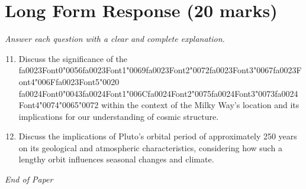 \documentclass[12pt]{article}
\begin{document}
\section*{Long Form Response (20 marks)}
\textit{Answer each question with a clear and complete explanation.}
\begin{enumerate}[label=\arabic*.]
\setcounter{enumi}{10}
\item Discuss the significance of the {\csname fa0023Font0\endcsname\char"0056}{\csname fa0023Font1\endcsname\char"0069}{\csname fa0023Font2\endcsname\char"0072}{\csname fa0023Font3\endcsname\char"0067}{\csname fa0023Font4\endcsname\char"006F}{\csname fa0023Font5\endcsname\char"0020} {\csname fa0024Font0\endcsname\char"0043}{\csname fa0024Font1\endcsname\char"006C}{\csname fa0024Font2\endcsname\char"0075}{\csname fa0024Font3\endcsname\char"0073}{\csname fa0024Font4\endcsname\char"0074}{\char"0065}{\char"0072} within the context of the Milky
Way's location and its implications for our understanding of cosmic structure.
\item Discuss the implications of Pluto's orbital period of approximately 250 years on its
geological and atmospheric characteristics, considering how such a lengthy orbit
influences seasonal changes and climate.
\end{enumerate}

\vfill
\noindent\textit{End of Paper}
\end{document}
